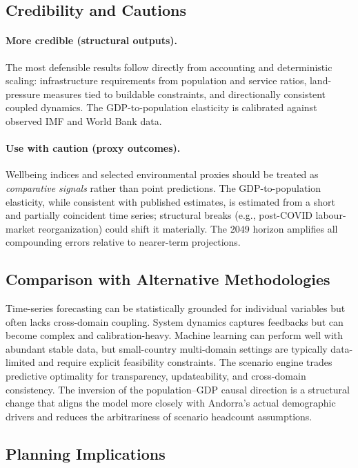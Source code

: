 \documentclass[urbansci,article,submit,pdftex,moreauthors]{Definitions/mdpi}
\begin{document}
\subsection{Credibility and Cautions}

\paragraph{More credible (structural outputs).}
The most defensible results follow directly from accounting and deterministic
scaling: infrastructure requirements from population and service ratios,
land-pressure measures tied to buildable constraints, and directionally
consistent coupled dynamics. The GDP-to-population elasticity is calibrated
against observed IMF and World Bank data.

\paragraph{Use with caution (proxy outcomes).}
Wellbeing indices and selected environmental proxies should be treated as
\emph{comparative signals} rather than point predictions. The GDP-to-population
elasticity, while consistent with published estimates, is estimated from a short
and partially coincident time series; structural breaks (e.g., post-COVID
labour-market reorganization) could shift it materially. The 2049 horizon
amplifies all compounding errors relative to nearer-term projections.

\subsection{Comparison with Alternative Methodologies}

Time-series forecasting can be statistically grounded for individual variables
but often lacks cross-domain coupling. System dynamics captures feedbacks but
can become complex and calibration-heavy. Machine learning can perform well with
abundant stable data, but small-country multi-domain settings are typically
data-limited and require explicit feasibility constraints. The scenario engine
trades predictive optimality for transparency, updateability, and cross-domain
consistency. The inversion of the population--GDP causal direction is a
structural change that aligns the model more closely with Andorra's actual
demographic drivers and reduces the arbitrariness of scenario headcount
assumptions.

\subsection{Planning Implications}
\end{document}
